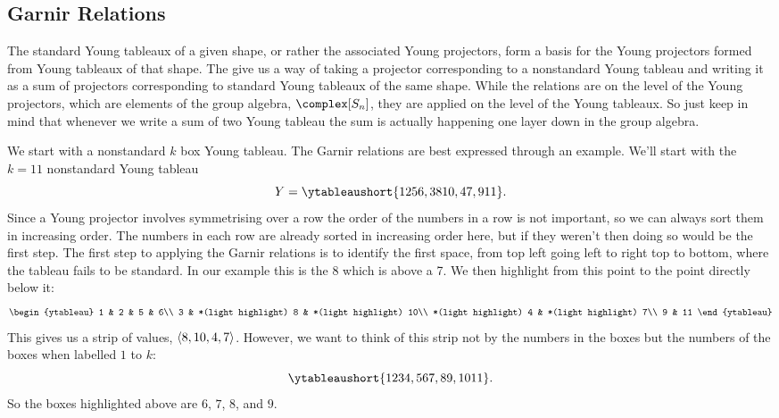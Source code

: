 \documentclass[fleqn]{NotesClass}
\newcommand{\symmetricGroup}[1][n]{S_{#1}}
\DeclarePairedDelimiter{\tuple}{\langle}{\rangle}
\begin{document}
    \subsection{Garnir Relations}
    The standard Young tableaux of a given shape, or rather the associated Young projectors, form a basis for the Young projectors formed from Young tableaux of that shape.
    The  give us a way of taking a projector corresponding to a nonstandard Young tableau and writing it as a sum of projectors corresponding to standard Young tableaux of the same shape.
    While the relations are on the level of the Young projectors, which are elements of the group algebra, \(\complex[\symmetricGroup]\), they are applied on the level of the Young tableaux.
    So just keep in mind that whenever we write a sum of two Young tableau the sum is actually happening one layer down in the group algebra.
    
    We start with a nonstandard \(k\) box Young tableau.
    The Garnir relations are best expressed through an example.
    We'll start with the \(k = 11\) nonstandard Young tableau
    \begin{equation}
        Y = \ytableaushort{1256,38{10},47,9{11}}.
    \end{equation}
    Since a Young projector involves symmetrising over a row the order of the numbers in a row is not important, so we can always sort them in increasing order.
    The numbers in each row are already sorted in increasing order here, but if they weren't then doing so would be the first step.
    The first step to applying the Garnir relations is to identify the first space, from top left going left to right top to bottom, where the tableau fails to be standard.
    In our example this is the 8 which is above a 7.
    We then highlight from this point to the point directly below it:
    \begin{equation}
        \begin{ytableau}
            1 & 2 & 5 & 6\\
            3 & *(light highlight) 8 & *(light highlight) 10\\
            *(light highlight) 4 & *(light highlight) 7\\
            9 & 11
        \end{ytableau}
    \end{equation}
    This gives us a strip of values, \(\tuple{8,10,4,7}\).
    However, we want to think of this strip not by the numbers in the boxes but the numbers of the boxes when labelled \(1\) to \(k\):
    \begin{equation}
        \ytableaushort{1234,567,89,{10}{11}}.
    \end{equation}
    So the boxes highlighted above are \(6\), \(7\), \(8\), and \(9\).
    
\end{document}
